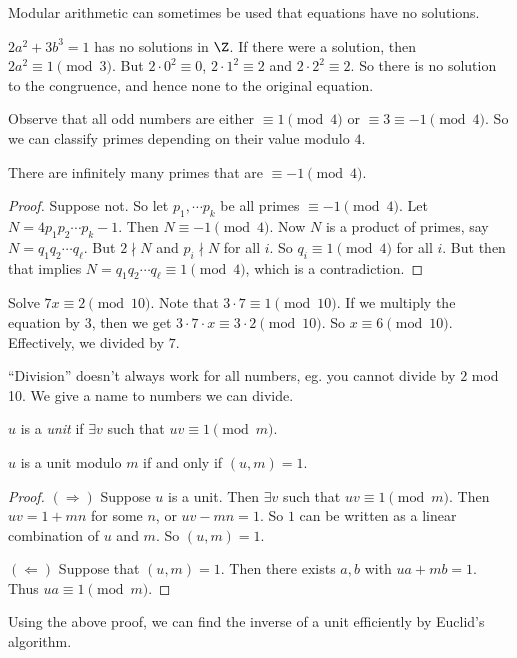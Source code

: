 \documentclass[a4paper]{article}
\begin{document}
Modular arithmetic can sometimes be used that equations have no solutions.
\begin{eg}
  $2a^2  + 3b^3 = 1$ has no solutions in $\Z$. If there were a solution, then $2a^2 \equiv 1\pmod 3$. But $2\cdot 0^2 \equiv 0$, $2\cdot 1^2\equiv 2$ and $2\cdot 2^2 \equiv 2$. So there is no solution to the congruence, and hence none to the original equation.
\end{eg}

Observe that all odd numbers are either $\equiv 1\pmod 4$ or $\equiv 3\equiv -1\pmod 4$. So we can classify primes depending on their value modulo $4$.

\begin{thm}
  There are infinitely many primes that are $\equiv -1 \pmod 4$.
\end{thm}

\begin{proof}
  Suppose not. So let $p_1, \cdots p_k$ be all primes $\equiv -1 \pmod 4$. Let $N = 4p_1p_2\cdots p_k - 1$. Then $N\equiv -1\pmod 4$. Now $N$ is a product of primes, say $N= q_1q_2\cdots q_\ell$. But $2\nmid N$ and $p_i\nmid N$ for all $i$. So $q_i \equiv 1\pmod 4$ for all $i$. But then that implies $N = q_1q_2\cdots q_\ell \equiv 1\pmod 4$, which is a contradiction.
\end{proof}

\begin{eg}
  Solve $7x \equiv 2 \pmod {10}$. Note that $3\cdot 7\equiv 1\pmod {10}$. If we multiply the equation by $3$, then we get $3\cdot 7\cdot x \equiv 3\cdot 2\pmod {10}$. So $x\equiv 6\pmod {10}$. Effectively, we divided by $7$.
\end{eg}
``Division'' doesn't always work for all numbers, eg. you cannot divide by $2$ mod 10. We give a name to numbers we can divide.

\begin{defi}
  $u$ is a \emph{unit} if $\exists v$ such that $uv \equiv 1\pmod m$.
\end{defi}

\begin{thm}
  $u$ is a unit modulo $m$ if and only if $(u, m) = 1$.
\end{thm}

\begin{proof}
  $(\Rightarrow)$ Suppose $u$ is a unit. Then $\exists v$ such that $uv \equiv 1\pmod m$. Then $uv = 1 + mn$ for some $n$, or $uv - mn = 1$. So $1$ can be written as a linear combination of $u$ and $m$. So $(u, m) = 1$.

  $(\Leftarrow)$ Suppose that $(u, m) = 1$. Then there exists $a, b$ with $ua + mb = 1$. Thus $ua \equiv 1\pmod m$.
\end{proof}
Using the above proof, we can find the inverse of a unit efficiently by Euclid's algorithm.
\end{document}
